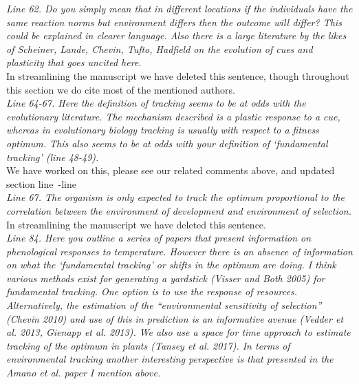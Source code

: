 \documentclass[11pt]{article}
\newcommand{\lr}[1]{line~\lineref{#1}}
\begin{document}
\emph{Line 62. Do you simply mean that in different locations if the individuals have the same
reaction norms but environment differs then the outcome will differ? This could be explained
in clearer language.  Also there is a large literature by the likes of Scheiner, Lande,
Chevin, Tufto, Hadfield on the evolution of cues and plasticity that goes uncited here.}\\

In streamlining the manuscript we have deleted this sentence, though throughout this section we do cite most of the mentioned authors.\\

\emph{Line 64-67. Here the definition of tracking seems to be at odds with the evolutionary
literature. The mechanism described is a plastic response to a cue, whereas in evolutionary
biology tracking is usually with respect to a fitness optimum. This also seems to be at odds
with your definition of `fundamental tracking' (line 48-49).}\\

We have worked on this, please see our related comments above, and updated section \lr{r1ass1}-\lr{moretrackE}\\

\emph{Line 67. The organism is only expected to track the optimum proportional to the correlation
between the environment of development and environment of selection.}\\

In streamlining the manuscript we have deleted this sentence.\\

\emph{Line 84. Here you outline a series of papers that present information on phenological
responses to temperature. However there is an absence of information on what the `fundamental
tracking' or shifts in the optimum are doing. I think various methods exist for generating a
yardstick (Visser and Both 2005) for fundamental tracking. One option is to use the response
of resources. Alternatively, the estimation of the ``environmental sensitivity of selection''
(Chevin 2010) and use of this in prediction is an informative avenue (Vedder et al. 2013,
Gienapp et al. 2013). We also use a space for time approach to estimate tracking of the
optimum in plants (Tansey et al. 2017). In terms of environmental tracking another
interesting perspective is that presented in the Amano et al. paper I mention above.}\\
\end{document}
